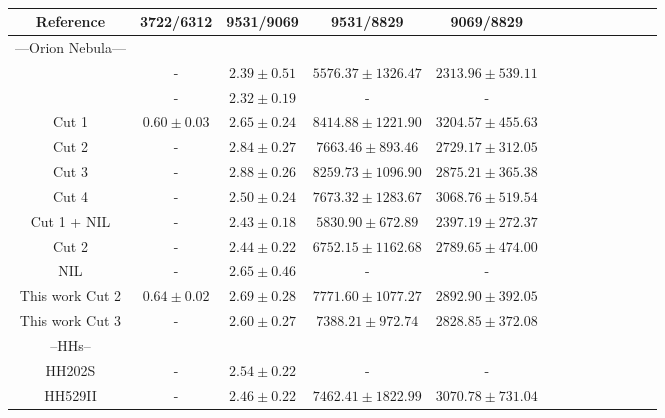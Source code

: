\documentclass[fleqn,usenatbib]{mnras}
\begin{document}
\begin{table}
\centering
\caption{}
\label{tab:atomic_data_test}
\begin{tabular}{ccccccccccccc}
\hline
Reference & 3722/6312 & 9531/9069 & 9531/8829 &9069/8829 \\
\hline
---Orion Nebula---\\

\citet{Esteban04} & - & $2.39 \pm 0.51$ & $5576.37 \pm 1326.47$ & $2313.96 \pm 539.11$\\

\citet{mesadelgado09} & - & $2.32 \pm 0.19$ & - & - \\

\citet{mendez2021} Cut 1 & $0.60 \pm 0.03$ & $2.65 \pm 0.24$ & $8414.88 \pm 1221.90$ & $3204.57 \pm 455.63$\\

\citet{mendez2021} Cut 2 & - &$2.84 \pm 0.27$ & $7663.46 \pm 893.46$& $2729.17 \pm 312.05$\\

\citet{mendez2021} Cut 3 & - &$2.88 \pm 0.26$&$8259.73 \pm 1096.90$&$2875.21 \pm 365.38$\\

\citet{mendez2021} Cut 4 & - &$2.50 \pm 0.24$&$7673.32 \pm 1283.67$ & $3068.76 \pm 519.54$ \\

 
\citet{mendez2021-2} Cut 1 + NIL & - & $2.43 \pm 0.18$ &$5830.90 \pm 672.89$&$2397.19 \pm 272.37$ \\

\citet{mendez2021-2} Cut 2 & - & $2.44 \pm 0.22$ & $6752.15 \pm 1162.68$& $2789.65 \pm 474.00$ \\

\citet{mendez2021-2} NIL & - &$2.65 \pm 0.46$ &-&- \\

This work Cut 2 & $0.64 \pm 0.02$ & $2.69 \pm 0.28$ & $7771.60 \pm 1077.27$ & $2892.90 \pm 392.05$\\


This work Cut 3 & - & $2.60 \pm 0.27$ & $7388.21 \pm 972.74$ & $2828.85 \pm 372.08$\\

--HHs--\\

\citet{mesadelgado09} HH202S & - & $2.54 \pm 0.22$ & -&-\\

\citet{mendez2021} HH529II &-&$2.46 \pm 0.22$&$7462.41 \pm 1822.99$&$3070.78 \pm 731.04$\\


\end{tabular}
\end{table}
\end{document}
